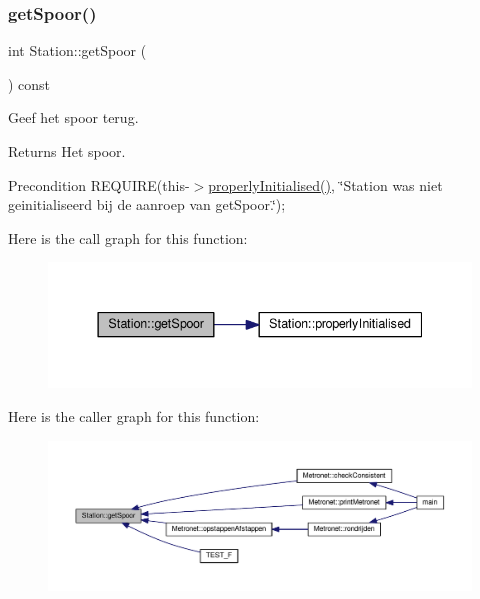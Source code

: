 \subsubsection{\texorpdfstring{get\+Spoor()}{getSpoor()}}
{\footnotesize\ttfamily int Station\+::get\+Spoor (\begin{DoxyParamCaption}{ }\end{DoxyParamCaption}) const}



Geef het spoor terug. 

\begin{DoxyReturn}{Returns}
Het spoor. 
\end{DoxyReturn}
\begin{DoxyPrecond}{Precondition}
R\+E\+Q\+U\+I\+RE(this-\/$>$\hyperlink{class_station_a9ce626dd0599e3ea8107404a59c21e16}{properly\+Initialised()}, \char`\"{}\+Station was niet geinitialiseerd bij de aanroep van get\+Spoor.\char`\"{}); 
\end{DoxyPrecond}
Here is the call graph for this function\+:\nopagebreak
\begin{figure}[H]
\begin{center}
\leavevmode
\includegraphics[width=337pt]{class_station_a081ca6373631199a30ebab56f50022d8_cgraph}
\end{center}
\end{figure}
Here is the caller graph for this function\+:\nopagebreak
\begin{figure}[H]
\begin{center}
\leavevmode
\includegraphics[width=350pt]{class_station_a081ca6373631199a30ebab56f50022d8_icgraph}
\end{center}
\end{figure}
\mbox{\label{class_station_a1c9f9e7d77d74e7b06bf627bcb2c0067}} 
